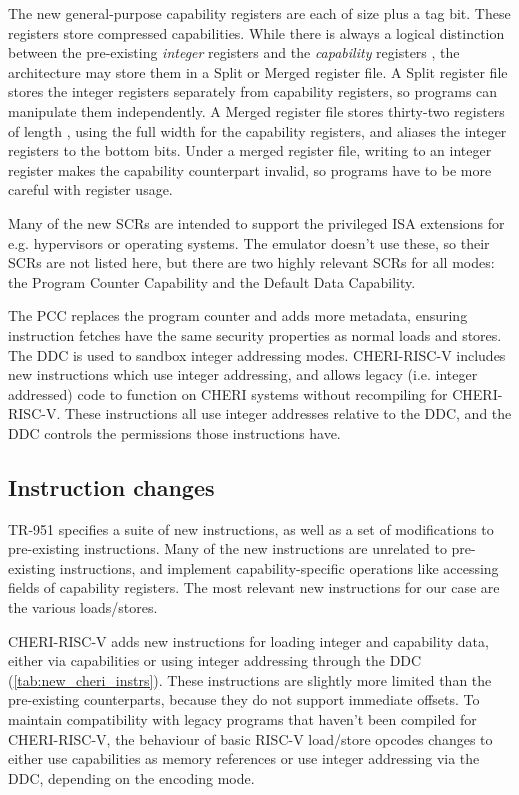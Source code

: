 The new general-purpose capability registers are each of size  plus a tag bit.
These registers store compressed capabilities.
While there is always a logical distinction between the pre-existing \emph{integer} registers  and the \emph{capability} registers , the architecture may store them in a Split or Merged register file.
A Split register file stores the integer registers separately from capability registers, so programs can manipulate them independently.
A Merged register file stores thirty-two registers of length , using the full width for the capability registers, and aliases the integer registers to the bottom  bits.
Under a merged register file, writing to an integer register makes the capability counterpart invalid, so programs have to be more careful with register usage.


Many of the new SCRs are intended to support the privileged ISA extensions for e.g. hypervisors or operating systems.
The emulator doesn't use these, so their SCRs are not listed here, but there are two highly relevant SCRs for all modes: the Program Counter Capability and the Default Data Capability.

The PCC replaces the program counter and adds more metadata, ensuring instruction fetches have the same security properties as normal loads and stores.
The DDC is used to sandbox integer addressing modes.
CHERI-RISC-V includes new instructions which use integer addressing, and allows legacy (i.e. integer addressed) code to function on CHERI systems without recompiling for CHERI-RISC-V.
These instructions all use integer addresses relative to the DDC, and the DDC controls the permissions those instructions have.

\subsection{Instruction changes}
TR-951 specifies a suite of new instructions, as well as a set of modifications to pre-existing instructions.
Many of the new instructions are unrelated to pre-existing instructions, and implement capability-specific operations like accessing fields of capability registers.
The most relevant new instructions for our case are the various loads/stores.

CHERI-RISC-V adds new instructions for loading integer and capability data, either via capabilities or using integer addressing through the DDC (\cref{tab:new_cheri_instrs}).
These instructions are slightly more limited than the pre-existing counterparts, because they do not support immediate offsets. 
To maintain compatibility with legacy programs that haven't been compiled for CHERI-RISC-V, the behaviour of basic RISC-V load/store opcodes changes to either use capabilities as memory references or use integer addressing via the DDC, depending on the encoding mode.

